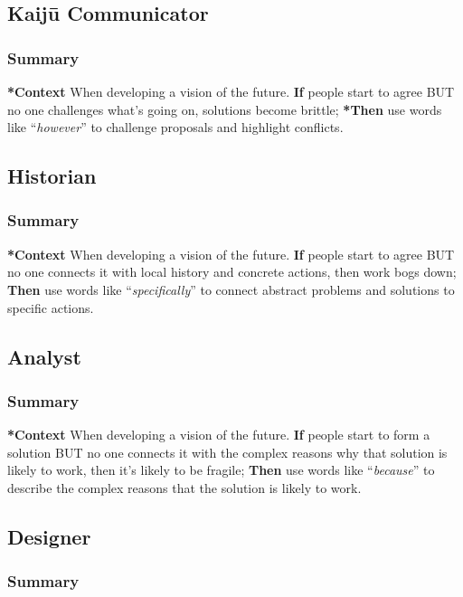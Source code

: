 \documentclass{article}
\begin{document}
\subsection{Kaijū Communicator}
\label{a0796d9e-664b-46fa-bb37-7f6a6fc15584}
\subsubsection{Summary}

\textbf{*Context} When developing a vision of the future. \textbf{If} people start to
agree BUT no one challenges what's going on, solutions become brittle;
\textbf{*Then} use words like ``\emph{however}'' to challenge proposals and highlight
conflicts.
\subsection{Historian}
\label{57d46961-a056-435e-85d2-27ab6e0de7f6}
\subsubsection{Summary}

\textbf{*Context} When developing a vision of the future. \textbf{If} people start to
agree BUT no one connects it with local history and concrete actions,
then work bogs down; \textbf{Then} use words like ``\emph{specifically}'' to connect
abstract problems and solutions to specific actions.
\subsection{Analyst}
\label{5826c7d9-8962-433d-83c5-27a5196908ea}
\subsubsection{Summary}

\textbf{*Context} When developing a vision of the future. \textbf{If} people start to
form a solution BUT no one connects it with the complex reasons why that
solution is likely to work, then it's likely to be fragile; \textbf{Then} use
words like ``\emph{because}'' to describe the complex reasons that the solution
is likely to work.
\subsection{Designer}
\label{48a1d6a3-800d-46bd-8a4a-0d3414ecf150}
\subsubsection{Summary}
\end{document}

